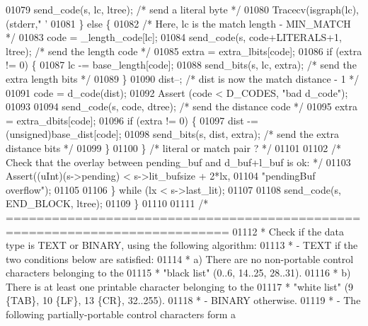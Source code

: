 \begin{DoxyCode}
{{{{{{{{{{{{{{{{{{{{{{{01079             send\_code(s, lc, ltree); \textcolor{comment}{/* send a literal byte */}
01080             Tracecv(isgraph(lc), (stderr,\textcolor{stringliteral}{" '%
01081         \} \textcolor{keywordflow}{else} \{
01082             \textcolor{comment}{/* Here, lc is the match length - MIN\_MATCH */}
01083             code = \_length\_code[lc];
01084             send\_code(s, code+LITERALS+1, ltree); \textcolor{comment}{/* send the length code */}
01085             extra = extra\_lbits[code];
01086             \textcolor{keywordflow}{if} (extra != 0) \{
01087                 lc -= base\_length[code];
01088                 send\_bits(s, lc, extra);       \textcolor{comment}{/* send the extra length bits */}
01089             \}
01090             dist--; \textcolor{comment}{/* dist is now the match distance - 1 */}
01091             code = d\_code(dist);
01092             Assert (code < D\_CODES, \textcolor{stringliteral}{"bad d\_code"});
01093 
01094             send\_code(s, code, dtree);       \textcolor{comment}{/* send the distance code */}
01095             extra = extra\_dbits[code];
01096             \textcolor{keywordflow}{if} (extra != 0) \{
01097                 dist -= (unsigned)base\_dist[code];
01098                 send\_bits(s, dist, extra);   \textcolor{comment}{/* send the extra distance bits */}
01099             \}
01100         \} \textcolor{comment}{/* literal or match pair ? */}
01101 
01102         \textcolor{comment}{/* Check that the overlay between pending\_buf and d\_buf+l\_buf is ok: */}
01103         Assert((uInt)(s->pending) < s->lit\_bufsize + 2*lx,
01104                \textcolor{stringliteral}{"pendingBuf overflow"});
01105 
01106     \} \textcolor{keywordflow}{while} (lx < s->last\_lit);
01107 
01108     send\_code(s, END\_BLOCK, ltree);
01109 \}
01110 
01111 \textcolor{comment}{/* ===========================================================================}
01112 \textcolor{comment}{ * Check if the data type is TEXT or BINARY, using the following algorithm:}
01113 \textcolor{comment}{ * - TEXT if the two conditions below are satisfied:}
01114 \textcolor{comment}{ *    a) There are no non-portable control characters belonging to the}
01115 \textcolor{comment}{ *       "black list" (0..6, 14..25, 28..31).}
01116 \textcolor{comment}{ *    b) There is at least one printable character belonging to the}
01117 \textcolor{comment}{ *       "white list" (9 \{TAB\}, 10 \{LF\}, 13 \{CR\}, 32..255).}
01118 \textcolor{comment}{ * - BINARY otherwise.}
01119 \textcolor{comment}{ * - The following partially-portable control characters form a}
}}}}}}}}}}}}}}}}}}}}}}}}
\end{DoxyCode}
